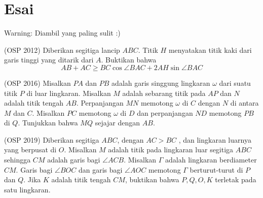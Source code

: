 \documentclass[11pt]{scrartcl}
\begin{document}
	\section{Esai}
	Warning: Diambil yang paling sulit :)
	\begin{soalbaru}
	(OSP 2012) Diberikan segitiga lancip $ABC$. Titik $H$ menyatakan titik kaki dari garis tinggi yang ditarik dari $A$. Buktikan bahwa
	$$AB+AC \ge BC \cos \angle BAC + 2AH \sin \angle BAC$$
	\end{soalbaru}
	\begin{soalbaru}
	(OSP 2016) Misalkan $PA$ dan $PB$ adalah garis singgung lingkaran $\omega$ dari suatu titik $P$ di luar lingkaran.
Misalkan $M$ adalah sebarang titik pada $AP$ dan $N$ adalah titik tengah $AB$. Perpanjangan
$MN$ memotong $\omega$ di $C$ dengan $N$ di antara $M$ dan $C$. Misalkan $PC$ memotong $\omega$ di $D$ dan
perpanjangan $ND$ memotong $PB$ di $Q$.
Tunjukkan bahwa $MQ$ sejajar dengan $AB$.
	\end{soalbaru}
	\begin{soalbaru} (OSP 2019)
	Diberikan segitiga $ABC$, dengan $AC > BC$ , dan lingkaran luarnya yang berpusat di $O$. Misalkan $M$ adalah titik pada lingkaran luar segitiga $ABC$ sehingga $CM$ adalah garis bagi $\angle ACB$. Misalkan $\Gamma$ adalah lingkaran berdiameter $CM$. Garis bagi $\angle BOC$ dan garis bagi $\angle AOC$ memotong $\Gamma$ berturut-turut di $P$ dan $Q$. Jika $K$ adalah titik tengah $CM$, buktikan bahwa $P,Q,O,K$ terletak pada satu lingkaran.
	\end{soalbaru}
\end{document}

